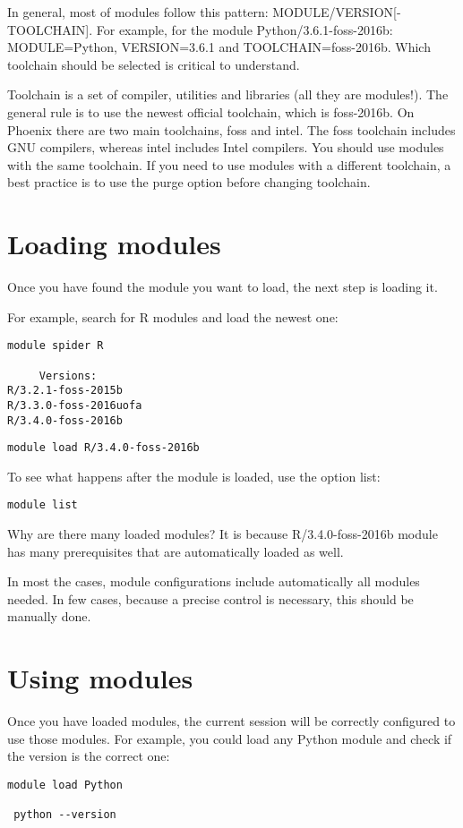In general, most of modules follow this pattern: MODULE/VERSION[-TOOLCHAIN]. For example, for the module Python/3.6.1-foss-2016b: MODULE=Python, VERSION=3.6.1 and TOOLCHAIN=foss-2016b.
Which toolchain should be selected is critical to understand.
\begin{information}
	Toolchain is a set of compiler, utilities and libraries (all they are modules!). The general rule is to use the newest official toolchain, which is foss-2016b. On Phoenix there are two main toolchains, foss and intel. The foss toolchain
	includes GNU compilers, whereas intel includes Intel compilers.
	You should use modules with the same toolchain. If you need to use modules with a different toolchain, a best practice is to use the purge option before changing toolchain.
\end{information}

\section{Loading modules}
Once you have found the module you want to load, the next step is loading it. 
\begin{steps}
For example, search for R modules and load the newest one: 
\begin{lstlisting}[style=command_syntax]
module spider R

     Versions:
R/3.2.1-foss-2015b
R/3.3.0-foss-2016uofa
R/3.4.0-foss-2016b

\end{lstlisting}

\begin{lstlisting}[style=command_syntax]
module load R/3.4.0-foss-2016b
\end{lstlisting}

To see what happens after the module is loaded, use the option list: 
\begin{lstlisting}[style=command_syntax]
module list
\end{lstlisting}
\end{steps}
Why are there many loaded modules? It is because R/3.4.0-foss-2016b module has many prerequisites that are automatically loaded as well.
\begin{information}
In most the cases, module configurations include automatically all modules needed. In few cases, because a precise control is necessary, this should be manually done. 
\end{information}

\section{Using modules}
Once you have loaded modules, the current session will be correctly configured to use those modules. For example, you could load any Python module and check if the version is the correct one:
 \begin{lstlisting}[style=command_syntax]
 module load Python
 
 python --version
 \end{lstlisting}

